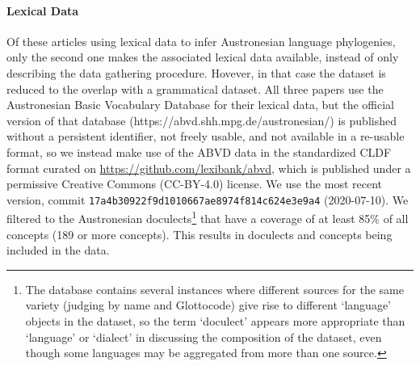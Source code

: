 \documentclass[a4paper,12pt]{scrartcl}
\begin{document}
\paragraph{Lexical Data}
Of these articles using lexical data to infer Austronesian language phylogenies, only the second one
\parencite{greenhill2018population} makes the associated lexical data available, instead of only describing the data gathering procedure.
Hovever, in that case the dataset is reduced to the overlap with a grammatical dataset.
All three papers use the Austronesian Basic Vocabulary Database for their lexical data, but the official version of that database
(https://abvd.shh.mpg.de/austronesian/) is published without a persistent identifier, not freely usable, and not available in a re-usable format, so we instead make use of the ABVD
data in the standardized CLDF format \parencite{cldf} curated on \url{https://github.com/lexibank/abvd}, which is published under a
permissive Creative Commons (CC-BY-4.0) license. We use the most recent version, commit \texttt{17a4b30922f9d1010667ae8974f814c624e3e9a4}
(2020-07-10). We filtered to the Austronesian doculects\footnote{The database contains several instances where different
sources for the same variety (judging by name and Glottocode) give rise to different ‘language’ objects in the dataset, so the term
‘doculect’ appears more appropriate than ‘language’ or ‘dialect’ in discussing the composition of the dataset, even though some languages may be aggregated from more than one source.} that have a coverage
of at least 85\% of all concepts (189 or more concepts). This results in \countlects{} doculects and \countconcepts{} concepts being included in the data.
\end{document}
